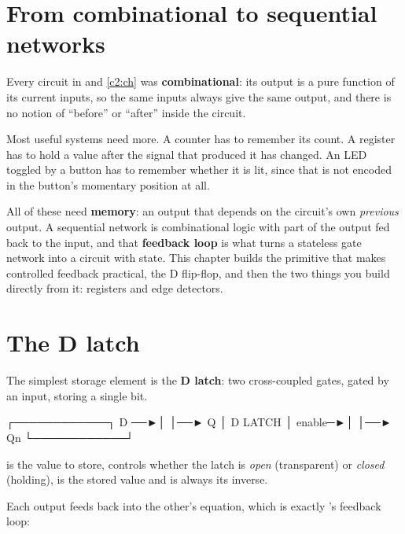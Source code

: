 
\section{From combinational to sequential networks}
\label{c3:sec:seq}

Every circuit in  and \ref{c2:ch} was \textbf{combinational}: its output is a pure
function of its current inputs, so the same inputs always give the same output, and there is no
notion of ``before'' or ``after'' inside the circuit.

Most useful systems need more. A counter has to remember its count. A register has to hold a value
after the signal that produced it has changed. An LED toggled by a button has to remember whether
it is lit, since that is not encoded in the button's momentary position at all.

All of these need \textbf{memory}: an output that depends on the circuit's own \emph{previous}
output. A sequential network is combinational logic with part of the output fed back to the input,
and that \textbf{feedback loop} is what turns a stateless gate network into a circuit with state.
This chapter builds the primitive that makes controlled feedback practical, the D flip-flop, and
then the two things you build directly from it: registers and edge detectors.

\section{The D latch}
\label{c3:sec:latch}

The simplest storage element is the \textbf{D latch}: two cross-coupled gates, gated by an
 input, storing a single bit.

\begin{textdrawing}
        ┌────────────┐
   D ──►│            │──► Q
        │  D LATCH   │
enable─►│            │──► Qn
        └────────────┘
\end{textdrawing}

 is the value to store,  controls whether the latch is \emph{open}
(transparent) or \emph{closed} (holding),  is the stored value and  is always its
inverse.

Each output feeds back into the other's equation, which is exactly 's feedback
loop:

